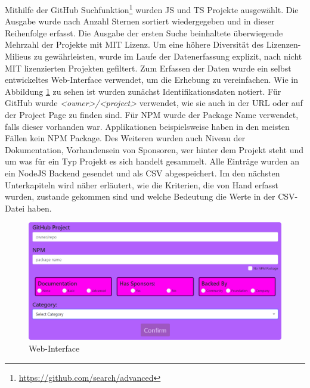 Mithilfe der GitHub Suchfunktion\footnote{\url{https://github.com/search/advanced}} wurden JS und
TS Projekte ausgewählt. Die Ausgabe wurde nach Anzahl Sternen sortiert wiedergegeben und in
dieser Reihenfolge erfasst.
Die Ausgabe der ersten Suche beinhaltete überwiegende Mehrzahl der Projekte mit MIT Lizenz. Um eine
höhere Diversität des Lizenzen-Milieus zu gewährleisten, wurde im Laufe der Datenerfassung explizit,
nach nicht MIT lizenzierten Projekten gefiltert.
Zum Erfassen der Daten wurde ein selbst entwickeltes Web-Interface verwendet, um die Erhebung
zu vereinfachen. Wie in Abbildung \ref{abb:Web_Interface} zu sehen ist wurden zunächst
Identifikationsdaten notiert. Für GitHub wurde \textit{<owner>/<project>} verwendet,
wie sie auch in der URL oder auf der Project Page zu finden sind. Für NPM wurde der Package Name
verwendet, falls dieser vorhanden war. Applikationen beispielsweise haben in den meisten
Fällen kein NPM Package.
Des Weiteren wurden auch Niveau der Dokumentation, Vorhandensein von Sponsoren, wer hinter dem
Projekt steht und um was für ein Typ Projekt es sich handelt gesammelt.
Alle Einträge wurden an ein NodeJS Backend gesendet und als CSV abgespeichert.
Im den nächsten Unterkapiteln wird näher erläutert, wie die Kriterien, die von Hand erfasst wurden,
zustande gekommen sind und welche Bedeutung die Werte in der CSV-Datei haben.

\newpage %
\begin{figure}[h]
    \centering
    \includegraphics[scale=0.25]{figures/04/WebInterface.png}
    \caption{Web-Interface}
    \label{abb:Web_Interface}
\end{figure}




